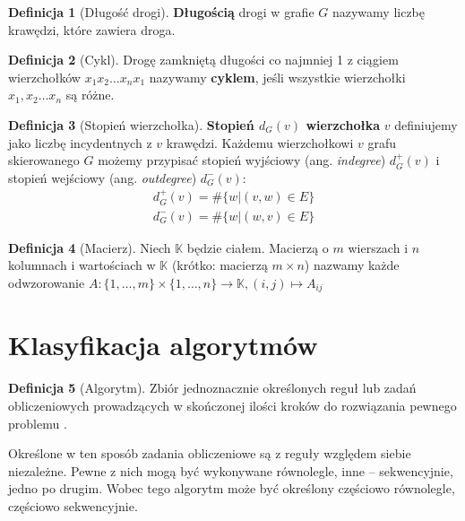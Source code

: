 \documentclass[a4paper,oneside,leqno,12pt]{book}
\theoremstyle{definition}
\newtheorem{definicja}{Definicja}[chapter]
\theoremstyle{plain}
\theoremstyle{remark}
\begin{document}
\begin{definicja}[Długość drogi]\label{def:dlugosc_drogi}
\textbf{Długością} drogi w grafie \(G\) nazywamy liczbę krawędzi, które zawiera droga.
\end{definicja}
\begin{definicja}[Cykl]\label{def:cykl_w_grafie}
Drogę zamkniętą długości co najmniej 1 z ciągiem wierzchołków \(x_1 x_2\dots x_n x_1\) nazywamy \textbf{cyklem}, jeśli wszystkie wierzchołki\\ \(x_1, x_2\dots x_n\) są różne.
\end{definicja}

\begin{definicja}[Stopień wierzchołka]\label{def:stopien_node}
\textbf{Stopień \(d_{G}(v)\) wierzchołka} \(v\) definiujemy jako liczbę incydentnych z \(v\) krawędzi. Każdemu wierzchołkowi \(v\) grafu skierowanego \(G\) możemy przypisać stopień wyjściowy (ang. \emph{indegree}) \(d_{G}^{+}(v)\) i stopień wejściowy (ang. \emph{outdegree}) \(d_{G}^{-}(v)\):
\begin{align*}
 d_{G}^{+}(v) = \#\{w|(v,w)\in E\}\\ 
 d_{G}^{-}(v) = \#\{w|(w,v)\in E\}
\end{align*}
\end{definicja}

\begin{definicja}[Macierz]\label{def:matrix}
Niech \(\mathbb{K}\) będzie ciałem. Macierzą o \(m\) wierszach i \(n\) kolumnach i wartościach w \(\mathbb{K}\) (krótko: macierzą \(m\times n\)) nazwamy każde odwzorowanie \(A:\{1,\dots, m\}\times \{1, \dots, n\}\xrightarrow{} \mathbb{K}, (i,j)\longmapsto A_{ij}\)
\end{definicja}



\newpage

\section{Klasyfikacja algorytmów}

\begin{definicja}[Algorytm]\label{def:algorytm}
Zbiór jednoznacznie określonych reguł lub zadań obliczeniowych prowadzących w skończonej ilości kroków do rozwiązania pewnego problemu \cite{IEEE}.\\
\end{definicja}

Określone w ten sposób zadania obliczeniowe są z reguły względem siebie niezależne. Pewne z nich mogą być wykonywane równolegle, inne -- sekwencyjnie, jedno po drugim. Wobec tego algorytm może być określony częściowo równolegle, częściowo sekwencyjnie.\\
\end{document}
